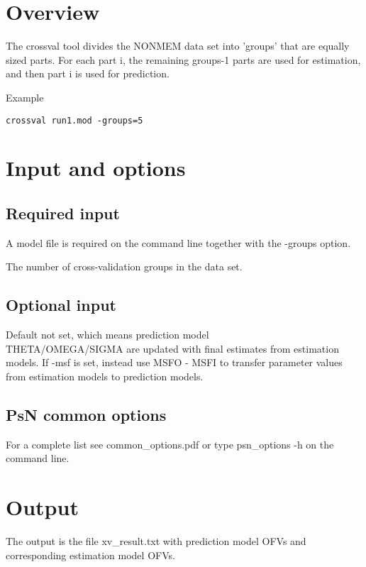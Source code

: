 



\maketitle
\newcommand{\guidetoolname}{crossval}


\section{Overview}

The crossval tool divides the NONMEM data set into 'groups' that are equally sized parts.
For each part i, the remaining groups-1 parts are used for estimation,
and then part i is used for prediction.

Example
\begin{verbatim}
crossval run1.mod -groups=5
\end{verbatim}

\section{Input and options}
	
\subsection{Required input}
A model file is required on the command line together with the -groups option.
\begin{optionlist}
The number of cross-validation groups in the data set.
\nextopt		
\end{optionlist}

\subsection{Optional input}
			
\begin{optionlist}
Default not set, which means prediction model\\
THETA/OMEGA/SIGMA are updated with final estimates from estimation models.
If -msf is set, instead use MSFO - MSFI to transfer parameter values from estimation models to prediction models.
\nextopt
\end{optionlist}

\subsection{PsN common options}
For a complete list see common\_options.pdf or type psn\_options -h on the command line.

\section{Output}

The output is the file xv\_result.txt with prediction model OFVs and corresponding estimation model OFVs.


